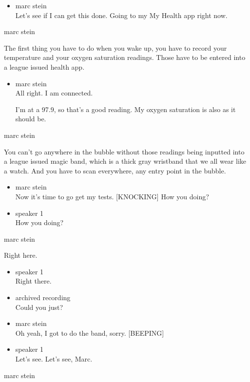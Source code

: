 \begin{itemize}
\tightlist
\item
  marc stein\\
  Let's see if I can get this done. Going to my My Health app right now.
\end{itemize}

marc stein

The first thing you have to do when you wake up, you have to record your
temperature and your oxygen saturation readings. Those have to be
entered into a league issued health app.

\begin{itemize}
\item
  marc stein\\
  All right. I am connected.

  I'm at a 97.9, so that's a good reading. My oxygen saturation is also
  as it should be.
\end{itemize}

marc stein

You can't go anywhere in the bubble without those readings being
inputted into a league issued magic band, which is a thick gray
wristband that we all wear like a watch. And you have to scan
everywhere, any entry point in the bubble.

\begin{itemize}
\item
  marc stein\\
  Now it's time to go get my tests. {[}KNOCKING{]} How you doing?
\item
  speaker 1\\
  How you doing?
\end{itemize}

marc stein

Right here.

\begin{itemize}
\item
  speaker 1\\
  Right there.
\item
  archived recording\\
  Could you just?
\item
  marc stein\\
  Oh yeah, I got to do the band, sorry. {[}BEEPING{]}
\item
  speaker 1\\
  Let's see. Let's see, Marc.
\end{itemize}

marc stein

